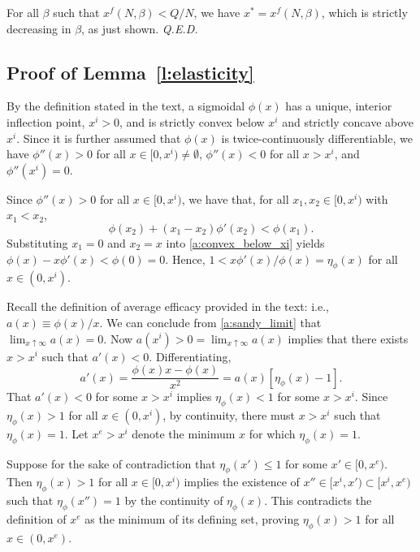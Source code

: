 \documentclass[12pt]{article}
\renewcommand{\qed}{{\it Q.E.D.}}
\newcommand{\efficacy}{\phi}
\newcommand{\average}{a}
\newcommand{\xfull}{x^{f\!}}
\newcommand{\xunit}{x^{e}}
\newcommand{\poi}{x^{i}}
\newcommand{\elasticity}[1]{\eta_{#1}}
\begin{document}
For all $\beta$ such that $\xfull(N, \beta) < Q/N$, we have $x^* = \xfull(N, \beta)$, which is strictly decreasing in $\beta$, as just shown. \qed


\subsection*{Proof of Lemma~\ref{l:elasticity}}

By the definition stated in the text, a sigmoidal $\efficacy(x)$ has a
unique, interior inflection point, $\poi > 0$, and is strictly convex
below $\poi$ and strictly concave above $\poi$. Since it is further
assumed that $\efficacy(x)$ is twice-continuously differentiable, we
have $\efficacy''(x) > 0$ for all $x \in [0, \poi) \neq \emptyset$,
  $\efficacy''(x) < 0$ for all $x > \poi$, and $\efficacy''(\poi) = 0$.

Since $\efficacy''(x) > 0$ for all $x \in [0, \poi)$, we have that, for
  all $x_1, x_2 \in [0, \poi)$ with $x_1 < x_2$,
\begin{equation}
\label{a:convex_below_xi}
\efficacy(x_2) + (x_1 - x_2) \efficacy'(x_2) < \efficacy(x_1).
\end{equation}
Substituting $x_1 = 0$ and $x_2 = x$ into \eqref{a:convex_below_xi}
yields $\efficacy(x) - x \efficacy'(x) < \efficacy(0) = 0$. Hence, $1
< x \efficacy'(x) / \efficacy(x) = \elasticity{\efficacy}(x)$ for all
$x \in (0,\poi)$.

Recall the definition of average efficacy provided in the text: i.e., $\average(x) \equiv \efficacy(x) /
x$. We can conclude from \eqref{a:sandy_limit} that $\lim_{x \uparrow \infty}
\average(x) = 0$. Now $\average(\poi) > 0 = \lim_{x \uparrow \infty}
\average(x)$ implies that there exists $x > \poi$ such that
$\average'(x) < 0$. Differentiating,
\begin{equation}
\label{a:diff_a}
\average'(x) = \frac{\efficacy(x)x - \efficacy(x)}{x^2} =
\average(x) [\elasticity{\efficacy}(x) - 1].
\end{equation}
That $\average'(x) < 0$ for some $x > \poi$ implies
$\elasticity{\efficacy}(x) < 1$ for some $x > \poi$. Since
$\elasticity{\efficacy}(x) > 1$ for all $x \in (0,\poi)$, by
continuity, there must $x > \poi$ such that $\elasticity{\efficacy}(x)
= 1$. Let $\xunit > \poi$ denote the minimum $x$ for which
$\elasticity{\efficacy}(x) = 1$.

Suppose for the sake of contradiction that $\elasticity{\efficacy}(x')
\leq 1$ for some $x' \in [0, \xunit)$. Then $\elasticity{\efficacy}(x) >
  1$ for all $x \in [0, \poi)$ implies the existence of $x'' \in [\poi,
      x') \subset [\poi, \xunit)$ such that $\elasticity{\efficacy}(x'') =
        1$ by the continuity of $\elasticity{\efficacy}(x)$. This
        contradicts the definition of $\xunit$ as the minimum of its
        defining set, proving $\elasticity{\efficacy}(x) > 1$ for all
        $x \in (0, \xunit)$.
\end{document}
